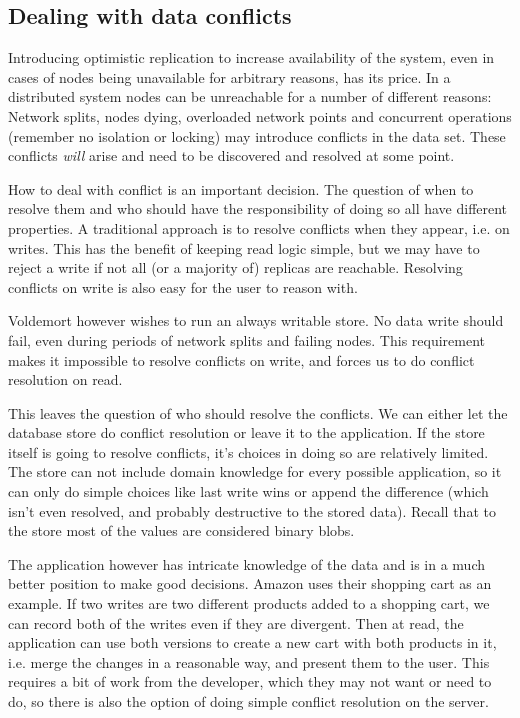 \subsection{Dealing with data conflicts}
Introducing optimistic replication to increase availability of the system, even in cases of nodes being unavailable for arbitrary reasons, has its price. 
In a distributed system nodes can be unreachable for a number of different reasons:
Network splits, nodes dying, overloaded network points and concurrent operations (remember no isolation or locking) may introduce conflicts in the data set.
These conflicts \emph{will} arise and need to be discovered and resolved at some point.

How to deal with conflict is an important decision.
The question of when to resolve them and who should have the responsibility of doing so all have different properties.
A traditional approach is to resolve conflicts when they appear, i.e. on writes. 
This has the benefit of keeping read logic simple, but we may have to reject a write if not all (or a majority of) replicas are reachable. Resolving conflicts on write is also easy for the user to reason with.

Voldemort however wishes to run an always writable store. No data write should fail, even during periods of network splits and failing nodes.
This requirement makes it impossible to resolve conflicts on write, and forces us to do conflict resolution on read.

This leaves the question of who should resolve the conflicts. We can either let the database store do conflict resolution or leave it to the application.
If the store itself is going to resolve conflicts, it's choices in doing so are relatively limited.
The store can not include domain knowledge for every possible application, so it can only do simple choices like last write wins or append the difference (which isn't even resolved, and probably destructive to the stored data). Recall that to the store most of the values are considered binary blobs.

The application however has intricate knowledge of the data and is in a much better position to make good decisions. 
Amazon\cite{dynamo} uses their shopping cart as an example. If two writes are two different products added to a shopping cart, we can record both of the writes even if they are divergent.
Then at read, the application can use both versions to create a new cart with both products in it, i.e. merge the changes in a reasonable way, and present them to the user.
This requires a bit of work from the developer, which they may not want or need to do, so there is also the option of doing simple conflict resolution on the server.


